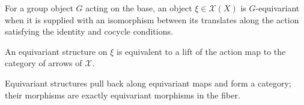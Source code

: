 \begin{definition}\label{fga-def-3-46}
For a group object $G$ acting on the base, an object $\xi\in\mathcal X(X)$ is
$G$-equivariant when it is supplied with an isomorphism between its translates
along the action satisfying the identity and cocycle conditions.
\end{definition}
\begin{proposition}\label{fga-prop-3-47}
An equivariant structure on $\xi$ is equivalent to a lift of the action map to
the category of arrows of $\mathcal X$.
\end{proposition}
\begin{proposition}\label{fga-prop-3-48}
Equivariant structures pull back along equivariant maps and form a category;
their morphisms are exactly equivariant morphisms in the fiber.
\end{proposition}
